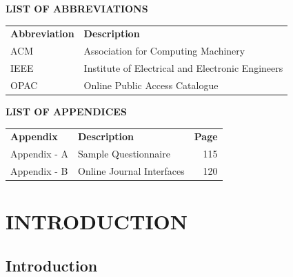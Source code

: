 \documentclass[12pt, a4paper]{report}
\begin{document}
\clearpage
\tableofcontents

\clearpage
{}
\listoffigures

\vspace{1.5in}
\listoftables

\clearpage
{}
\begin{center}
    \textbf{LIST OF ABBREVIATIONS}
\end{center}
\vspace{0.3in}
\noindent
\begin{tabular}{@{}p{1.5in}l@{}}
\textbf{Abbreviation} & \textbf{Description} \\[0.2in]
ACM & Association for Computing Machinery \\
IEEE & Institute of Electrical and Electronic Engineers \\
OPAC & Online Public Access Catalogue \\
\end{tabular}

\clearpage
{}
\begin{center}
    \textbf{LIST OF APPENDICES}
\end{center}
\vspace{0.3in}
\noindent
\begin{tabular}{@{}p{1.2in}p{3.5in}r@{}}
\textbf{Appendix} & \textbf{Description} & \textbf{Page} \\[0.2in]
Appendix - A & Sample Questionnaire & 115 \\
Appendix - B & Online Journal Interfaces & 120 \\
\end{tabular}


\clearpage
{}
\setcounter{page}{1}

\chapter{INTRODUCTION}
\section{Introduction}
\end{document}
